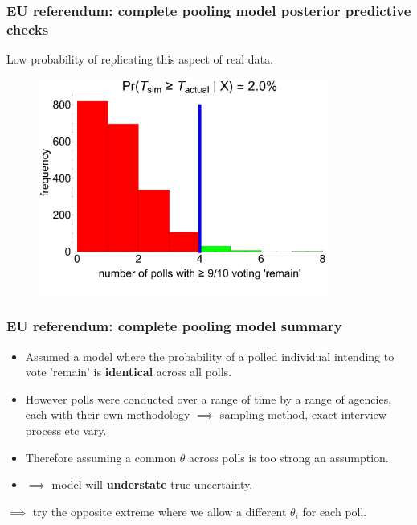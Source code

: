 \documentclass[handout]{beamer}
\begin{document}
\begin{frame}
	\frametitle{ EU referendum: complete pooling model posterior predictive checks}
	Low probability of replicating this aspect of real data.
	
	\begin{figure}[ht]
		\centerline{\includegraphics[width=0.85\textwidth]{figures/lec6_euHomoPPCRuns2.pdf}}
	\end{figure}
	
\end{frame}

\begin{frame}
	\frametitle{EU referendum: complete pooling model summary}
	\begin{itemize}
		\item<2-> Assumed a model where the probability of a polled individual intending to vote 'remain' is \textbf{identical} across all polls.
		\item<3-> However polls were conducted over a range of time by a range of agencies, each with their own methodology $\implies$ sampling method, exact interview process etc vary.
		\item<4-> Therefore assuming a common $\theta$ across polls is too strong an assumption.
		\item<5-> $\implies$ model will \textbf{understate} true uncertainty.
	\end{itemize}
	
	$\implies$ try the opposite extreme where we allow a different $\theta_i$ for each poll.
	
\end{frame}
\end{document}
